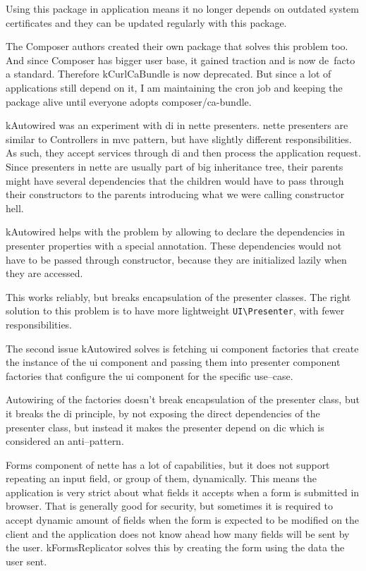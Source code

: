 Using this package in application means it no longer depends on outdated system certificates and they can be updated regularly with this package.

The Composer authors created their own package  that solves this problem too. And since Composer has bigger user base, it gained traction and is now de~facto a standard. Therefore \gls{kCurlCaBundle} is now deprecated. But since a lot of applications still depend on it, I am maintaining the cron job and keeping the package alive until everyone adopts composer/ca-bundle.

 \label{sec:state:autowired}

\gls{kAutowired} was an experiment with \gls{di} in \gls{nette} presenters. \gls{nette} presenters are similar to Controllers in \gls{mvc} pattern, but have slightly different responsibilities. As such, they accept services through \gls{di} and then process the application request. Since presenters in \gls{nette} are usually part of big inheritance tree, their parents might have several dependencies that the children would have to pass through their constructors to the parents introducing what we were calling constructor hell.

\gls{kAutowired} helps with the problem by allowing to declare the dependencies in presenter properties with a special annotation. These dependencies would not have to be passed through constructor, because they are initialized lazily when they are accessed.

This works reliably, but breaks encapsulation of the presenter classes. The right solution to this problem is to have more lightweight \lstinline{UI\Presenter}, with fewer responsibilities.

The second issue \gls{kAutowired} solves is fetching \gls{ui} component factories that create the instance of the \gls{ui} component and passing them into presenter component factories that configure the \gls{ui} component for the specific use--case.

Autowiring of the factories doesn't break encapsulation of the presenter class, but it breaks the \gls{di} principle, by not exposing the direct dependencies of the presenter class, but instead it makes the presenter depend on \gls{dic} which is considered an anti--pattern.

 \label{sec:state:forms-replicator}

Forms component of \gls{nette} has a lot of capabilities, but it does not support repeating an input field, or group of them, dynamically. This means the application is very strict about what fields it accepts when a form is submitted in browser. That is generally good for security, but sometimes it is required to accept dynamic amount of fields when the form is expected to be modified on the client and the application does not know ahead how many fields will be sent by the user. \gls{kFormsReplicator} solves this by creating the form using the data the user sent.

